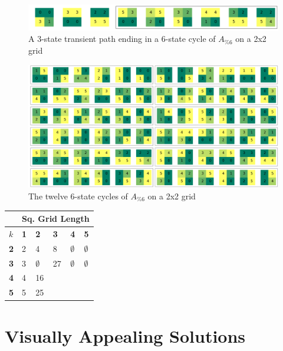 \documentclass[11pt]{article}
\begin{document}
\begin{figure}
  \caption{A 3-state transient path ending in a 6-state cycle of $A_{\% 6}$ on a 2x2 grid}
\label{cycle622}
\includegraphics[width=\textwidth]{cycle622.png}
\end{figure}

\begin{figure}
\caption{The twelve 6-state cycles of $A_{\% 6}$ on a 2x2 grid}
\label{cycle622}
\includegraphics[width=\textwidth]{all-len-6-cycles-622.png}
\end{figure}

\begin{tabular}{|l|l|l|l|l|l|}
  \hline
  & \multicolumn{5}{|c|}{Sq. Grid Length} \\ \hline
  $k$ & \textbf{1} & \textbf{2} & \textbf{3} & \textbf{4} & \textbf{5} \\ \hline
  \textbf{2} & 2 & 4 & 8 & $\emptyset$ & $\emptyset$ \\ \hline
  \textbf{3} & 3 & $\emptyset$ & 27 & $\emptyset$ & $\emptyset$ \\ \hline
  \textbf{4} & 4 & 16 & \\ \hline
  \textbf{5} & 5 & 25 \\ \hline
\end{tabular}


\section*{Visually Appealing Solutions}

\clearpage
\end{document}
